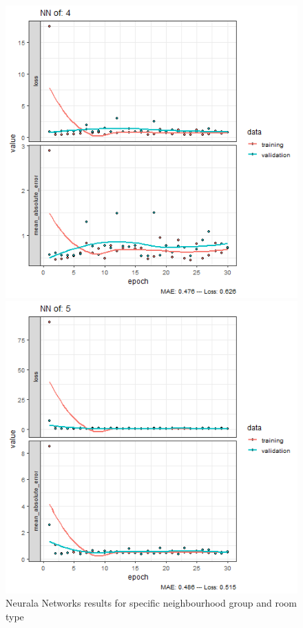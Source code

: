 \documentclass{FR16}
\begin{document}
\begin{figure}[!htb]
\begin{minipage}{0.33\textwidth}
   \end{minipage}\hfill
   \begin{minipage}{0.33\textwidth}
     \centering
     \includegraphics[width=1\linewidth]{figures/NN-4.png}
   \end{minipage}
   \begin{minipage}{0.33\textwidth}
     \centering
     \includegraphics[width=1\linewidth]{figures/NN-5.png}
   \end{minipage}
        \caption{Neurala Networks results for specific neighbourhood group and room type}\label{fig:20}

\end{figure}
\end{document}
